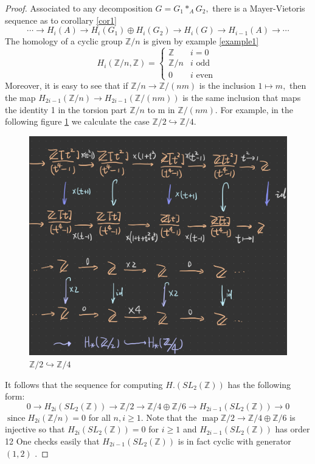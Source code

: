 \begin{proof}
Associated to any decomposition $G=G_{1} *_{A} G_{2},$ there is a Mayer-Vietoris sequence as to corollary \ref{cor1}
\[
\cdots \rightarrow H_{i}(A) \rightarrow H_{i}\left(G_{1}\right) \oplus H_{i}\left(G_{2}\right) \rightarrow H_{i}(G) \rightarrow H_{i-1}(A) \rightarrow \cdots
\]
The homology of a cyclic group $\mathbb{Z} / n$ is given by example \ref{example1}
\[
H_{i}(\mathbb{Z} / n, \mathbb{Z})=\left\{\begin{array}{ll}
\mathbb{Z} & i=0 \\
\mathbb{Z} / n & i \text { odd } \\
0 & i \text { even }
\end{array}\right.
\]
Moreover, it is easy to see that if $\mathbb{Z} / n \rightarrow \mathbb{Z} /(n m)$ is the inclusion $1 \mapsto m,$ then the map $H_{2 i-1}(\mathbb{Z} / n) \rightarrow H_{2 i-1}(\mathbb{Z} /(n m))$ is the same inclusion that maps the identity 1 in the torsion part $\mathbb{Z} / n$ to m in $\mathbb{Z} / (n m)$. For example, in the following figure \ref{fig:my_label} we calculate the case $\mathbb{Z} / 2\hookrightarrow\mathbb{Z} /4$.
\begin{figure}
    \centering
    \includegraphics[scale=0.2]{injection.jpg}
    \caption{$\mathbb{Z} / 2\hookrightarrow\mathbb{Z} /4$}
    \label{fig:my_label}
\end{figure}
\newpage
It follows that the sequence for computing $H .\left(S L_{2}(\mathbb{Z})\right)$ has the following form:
\[
0 \rightarrow H_{2 i}\left(S L_{2}(\mathbb{Z})\right) \rightarrow \mathbb{Z} / 2 \rightarrow \mathbb{Z} / 4 \oplus \mathbb{Z} / 6 \rightarrow H_{2 i-1}\left(S L_{2}(\mathbb{Z})\right) \rightarrow 0
\]
$\operatorname{since} H_{2 i}(\mathbb{Z} / n)=0$ for all $n, i \geq 1 .$ Note that the $\operatorname{map} \mathbb{Z} / 2 \rightarrow \mathbb{Z} / 4 \oplus \mathbb{Z} / 6$ is
injective so that $H_{2 i}\left(S L_{2}(\mathbb{Z})\right)=0$ for $i \geq 1$ and $H_{2 i-1}\left(S L_{2}(\mathbb{Z})\right)$ has order 12 One checks easily that $H_{2 i-1}\left(S L_{2}(\mathbb{Z})\right)$ is in fact cyclic with generator $(1,2)$ .
\end{proof}

